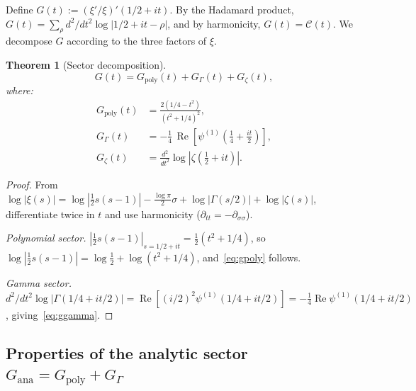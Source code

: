 \documentclass[11pt]{amsart}
\newtheorem{theorem}{Theorem}[section]
\renewcommand{\Re}{\operatorname{Re}}
\begin{document}
Define $G(t) := (\xi'/\xi)'(1/2+it)$.  By the Hadamard product,
$G(t) = \sum_\rho d^2/dt^2 \log|1/2+it-\rho|$, and by harmonicity,
$G(t) = \mathcal{C}(t)$.  We decompose $G$ according to the three factors of $\xi$.

\begin{theorem}[Sector decomposition]\label{thm:sectors}
\[
  G(t) = G_{\mathrm{poly}}(t) + G_\Gamma(t) + G_\zeta(t),
\]
where:
\begin{align}
  G_{\mathrm{poly}}(t) &= \frac{2(1/4 - t^2)}{(t^2+1/4)^2}, \label{eq:gpoly}\\[4pt]
  G_\Gamma(t) &= -\tfrac{1}{4}\,\Re\!\left[\psi^{(1)}\!\left(\tfrac{1}{4}+\tfrac{it}{2}\right)\right],
  \label{eq:ggamma}\\[4pt]
  G_\zeta(t) &= \frac{d^2}{dt^2}\log|\zeta\!\left(\tfrac{1}{2}+it\right)|.
  \label{eq:gzeta}
\end{align}
\end{theorem}

\begin{proof}
From $\log|\xi(s)| = \log|\tfrac{1}{2}s(s-1)| - \tfrac{\log\pi}{2}\sigma + \log|\Gamma(s/2)| + \log|\zeta(s)|$,
differentiate twice in $t$ and use harmonicity ($\partial_{tt} = -\partial_{\sigma\sigma}$).

\medskip\noindent\textit{Polynomial sector.} $|\tfrac{1}{2}s(s-1)|_{s=1/2+it} = \tfrac{1}{2}(t^2+1/4)$, so
$\log|\tfrac{1}{2}s(s-1)| = \log\tfrac{1}{2}+\log(t^2+1/4)$, and~\eqref{eq:gpoly} follows.

\medskip\noindent\textit{Gamma sector.} $d^2/dt^2\log|\Gamma(1/4+it/2)| = \Re[(i/2)^2\psi^{(1)}(1/4+it/2)]
= -\tfrac{1}{4}\Re\psi^{(1)}(1/4+it/2)$, giving~\eqref{eq:ggamma}.
\end{proof}

\subsection{Properties of the analytic sector $G_{\mathrm{ana}} = G_{\mathrm{poly}} + G_\Gamma$}
\end{document}
